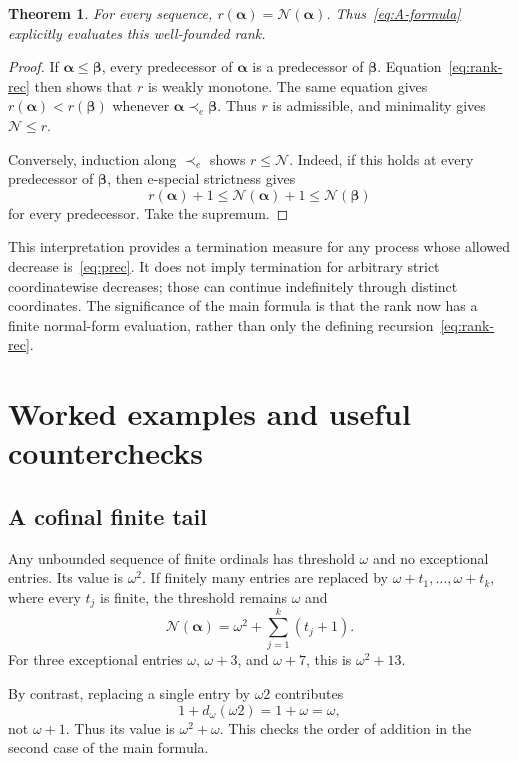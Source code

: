 \documentclass[11pt,letterpaper]{article}
\newtheorem{theorem}{Theorem}[section]
\theoremstyle{definition}
\theoremstyle{remark}
\newcommand{\Nop}{\mathcal N}
\newcommand{\seq}[1]{\boldsymbol{#1}}
\newcommand{\diff}[2]{d_{#1}(#2)}
\begin{document}
\begin{theorem}\label{thm:rank}
For every sequence, $r(\seq\alpha)=\Nop(\seq\alpha)$. Thus~\eqref{eq:A-formula} explicitly evaluates this well-founded rank.
\end{theorem}
\begin{proof}
If $\seq\alpha\le\seq\beta$, every predecessor of $\seq\alpha$ is a predecessor of $\seq\beta$. Equation~\eqref{eq:rank-rec} then shows that $r$ is weakly monotone. The same equation gives $r(\seq\alpha)<r(\seq\beta)$ whenever $\seq\alpha\prec_e\seq\beta$. Thus $r$ is admissible, and minimality gives $\Nop\le r$.

Conversely, induction along $\prec_e$ shows $r\le\Nop$. Indeed, if this holds at every predecessor of $\seq\beta$, then e-special strictness gives
\[
 r(\seq\alpha)+1\le\Nop(\seq\alpha)+1\le\Nop(\seq\beta)
\]
for every predecessor. Take the supremum.
\end{proof}

This interpretation provides a termination measure for any process whose allowed decrease is~\eqref{eq:prec}. It does not imply termination for arbitrary strict coordinatewise decreases; those can continue indefinitely through distinct coordinates. The significance of the main formula is that the rank now has a finite normal-form evaluation, rather than only the defining recursion~\eqref{eq:rank-rec}.

\section{Worked examples and useful counterchecks}\label{sec:examples}

\subsection{A cofinal finite tail}

Any unbounded sequence of finite ordinals has threshold $\omega$ and no exceptional entries. Its value is $\omega^2$. If finitely many entries are replaced by $\omega+t_1,\ldots,\omega+t_k$, where every $t_j$ is finite, the threshold remains $\omega$ and
\begin{equation}\label{eq:near-example}
 \Nop(\seq\alpha)=\omega^2+\sum_{j=1}^k(t_j+1).
\end{equation}
For three exceptional entries $\omega$, $\omega+3$, and $\omega+7$, this is $\omega^2+13$.

By contrast, replacing a single entry by $\omega2$ contributes
\[
 1+\diff\omega{\omega2}=1+\omega=\omega,
\]
not $\omega+1$. Thus its value is $\omega^2+\omega$. This checks the order of addition in the second case of the main formula.
\end{document}
